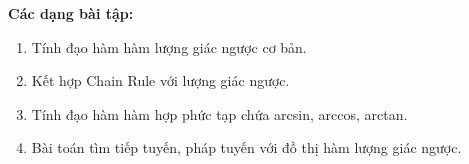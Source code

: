 \documentclass[12pt,a4paper]{article}
\begin{document}
\medskip\noindent\textbf{Các dạng bài tập:}
\begin{enumerate}[label=\textbf{Dạng \arabic*:}, leftmargin=*, align=left]
  \item Tính đạo hàm hàm lượng giác ngược cơ bản.
  \item Kết hợp Chain Rule với lượng giác ngược.
  \item Tính đạo hàm hàm hợp phức tạp chứa arcsin, arccos, arctan.
  \item Bài toán tìm tiếp tuyến, pháp tuyến với đồ thị hàm lượng giác ngược.
\end{enumerate}
\end{document}

